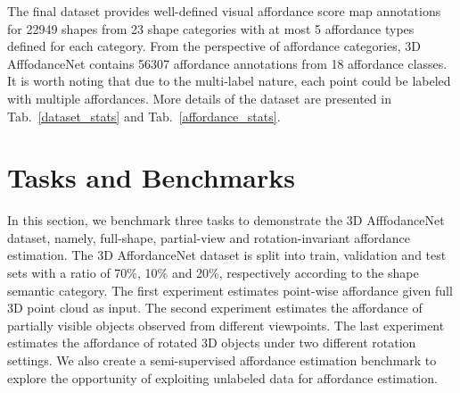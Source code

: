 \documentclass[final]{cvpr}
\begin{document}
The final dataset provides well-defined visual affordance score map annotations for 22949 shapes from 23 shape categories with at most 5 affordance types defined for each category. From the perspective of affordance categories, 3D AfffodanceNet contains 56307 affordance annotations from 18 affordance classes. It is worth noting that due to the multi-label nature, each point could be labeled with multiple affordances. More details of the dataset are presented in Tab.~\ref{dataset_stats} and Tab.~\ref{affordance_stats}. 





\section{Tasks and Benchmarks}
In this section, we benchmark three tasks to demonstrate the 3D AfffodanceNet dataset, namely, full-shape, partial-view and rotation-invariant affordance estimation. The 3D AffordanceNet dataset is split into train, validation and test sets with a ratio of 70\%, 10\% and 20\%, respectively according to the shape semantic category. 
The first experiment estimates point-wise affordance given full 3D point cloud as input. The second experiment estimates the affordance of partially visible objects observed from different viewpoints. The last experiment estimates the affordance of rotated 3D objects under two different rotation settings. We also create a semi-supervised affordance estimation benchmark to explore the opportunity of exploiting unlabeled data for affordance estimation.
\vspace{-0.1cm}


\begin{table}[t]
\caption{The number of shapes that are positive for each category of affordance.}
\vspace{-0.6cm}
\label{affordance_stats}
\end{table}
\end{document}

